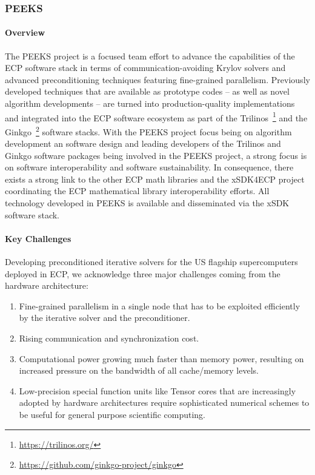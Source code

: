 \subsubsection{ PEEKS} 
\paragraph{Overview} 
The PEEKS project is a focused team effort to advance the capabilities of the
ECP software stack in terms of communication-avoiding Krylov solvers and
advanced preconditioning techniques featuring fine-grained parallelism.
Previously developed techniques that are available as prototype codes -- as
well as novel algorithm developments -- are turned into production-quality 
implementations and integrated into the ECP software ecosystem 
as part of the Trilinos~\footnote{\url{https://trilinos.org/}} and the  
Ginkgo~\footnote{\url{https://github.com/ginkgo-project/ginkgo}} software 
stacks. 
With the PEEKS project focus being on algorithm development an software design 
and leading developers of the Trilinos and Ginkgo software packages being 
involved in the PEEKS project, a strong focus is on software interoperability 
and software sustainability. In consequence, there exists a strong link to the 
other ECP math libraries and the xSDK4ECP project coordinating the ECP 
mathematical library interoperability efforts. All technology developed in 
PEEKS is available and disseminated via the xSDK software stack.


\paragraph{Key  Challenges}
Developing preconditioned iterative solvers for the US flagship supercomputers 
deployed in ECP, we acknowledge three major challenges coming from the hardware 
architecture:
\begin{enumerate}
\item 
Fine-grained parallelism in a single node that has to be exploited efficiently 
by the iterative solver and the preconditioner.
\item
Rising communication and synchronization cost.
\item
Computational power growing much faster than memory power, resulting on 
increased pressure on the bandwidth of all cache/memory levels.
\item 
Low-precision special function units like Tensor cores that are increasingly 
adopted by hardware architectures require sophisticated numerical schemes to be 
useful for general purpose scientific computing.
\end{enumerate}

